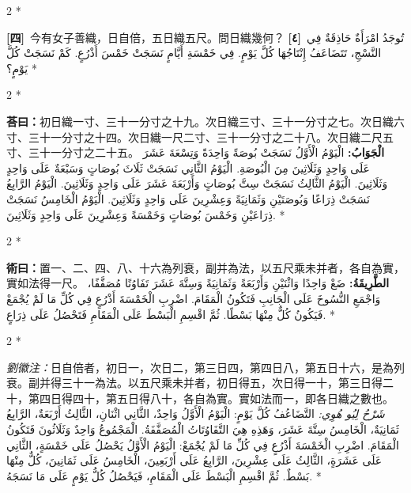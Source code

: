\documentclass[11pt,a4paper]{article}
\newcommand{\ar}[1]{\arabicfont\beginR #1\endR}
\newcommand{\problemnum}[1]{\textbf{[\ignorespaces#1\unskip]}}
\newenvironment{bilingual}{%
  \begin{paracol}{2}%
  \switchcolumn[0]*%
}{%
  \end{paracol}%
}
\newcommand{\cnline}[1]{\switchcolumn[0]\noindent #1 \switchcolumn[1]}
\newcommand{\arline}[1]{\noindent\ar{#1} \switchcolumn[0]*}
\newenvironment{prob bilingual}{%
  \begin{paracol}{2}%
  \switchcolumn[0]*%
}{%
  \end{paracol}%
  \vspace{0.3em}%
}
\begin{document}
\begin{bilingual}
\cnline{\problemnum{四}\, 今有女子善織，日自倍，五日織五尺。問日織幾何？}
\arline{\problemnum{٤}\, تُوجَدُ امْرَأَةٌ حَاذِقَةٌ فِي النَّسْجِ، تَتَضَاعَفُ إِنْتَاجُهَا كُلَّ يَوْمٍ. فِي خَمْسَةِ أَيَّامٍ نَسَجَتْ خَمْسَ أَذْرُعٍ. كَمْ نَسَجَتْ كُلَّ يَوْمٍ؟}
\end{bilingual}

\begin{bilingual}
\cnline{\textcolor{answercolor}{\textbf{荅曰：}}初日織一寸、三十一分寸之十九。次日織三寸、三十一分寸之七。次日織六寸、三十一分寸之十四。次日織一尺二寸、三十一分寸之二十八。次日織二尺五寸、三十一分寸之二十五。}
\arline{\textcolor{answercolor}{\textbf{الْجَوَابُ:}} الْيَوْمُ الْأَوَّلُ نَسَجَتْ بُوصَةً وَاحِدَةً وَتِسْعَةَ عَشَرَ عَلَى وَاحِدٍ وَثَلَاثِينَ مِنَ الْبُوصَةِ. الْيَوْمُ الثَّانِي نَسَجَتْ ثَلَاثَ بُوصَاتٍ وَسَبْعَةٌ عَلَى وَاحِدٍ وَثَلَاثِينَ. الْيَوْمُ الثَّالِثُ نَسَجَتْ سِتَّ بُوصَاتٍ وَأَرْبَعَةَ عَشَرَ عَلَى وَاحِدٍ وَثَلَاثِينَ. الْيَوْمُ الرَّابِعُ نَسَجَتْ ذِرَاعًا وَبُوصَتَيْنِ وَثَمَانِيَةً وَعِشْرِينَ عَلَى وَاحِدٍ وَثَلَاثِينَ. الْيَوْمُ الْخَامِسُ نَسَجَتْ ذِرَاعَيْنِ وَخَمْسَ بُوصَاتٍ وَخَمْسَةً وَعِشْرِينَ عَلَى وَاحِدٍ وَثَلَاثِينَ.}
\end{bilingual}

\begin{bilingual}
\cnline{%
\textcolor{methodcolor}{\textbf{術曰：}}置一、二、四、八、十六為列衰，副并為法，以五尺乘未并者，各自為實，實如法得一尺。
}
\arline{%
\textcolor{methodcolor}{\textbf{الطَّرِيقَةُ:}} ضَعْ وَاحِدًا وَاثْنَيْنِ وَأَرْبَعَةً وَثَمَانِيَةً وَسِتَّةَ عَشَرَ تَفَاوُتًا مُصَفَّفًا، وَاجْمَعِ النُّسُوخَ عَلَى الْجَانِبِ فَتَكُونُ الْمَقَامَ. اضْرِبِ الْخَمْسَةَ أَذْرُعٍ فِي كُلِّ مَا لَمْ يُجْمَعْ فَيَكُونُ كُلٌّ مِنْهَا بَسْطًا. ثُمَّ اقْسِمِ الْبَسْطَ عَلَى الْمَقَامِ فَتَحْصُلُ عَلَى ذِرَاعٍ.
}
\end{bilingual}

\begin{bilingual}
\cnline{%
\textcolor{commentarycolor}{\small\textit{劉徽注：}}日自倍者，初日一，次日二，第三日四，第四日八，第五日十六，是為列衰。副并得三十一為法。以五尺乘未并者，初日得五，次日得一十，第三日得二十，第四日得四十，第五日得八十，各自為實。實如法而一，即各日織之數也。
}
\arline{%
\textcolor{commentarycolor}{\small\textit{شَرْحُ لِيُو هُوِي:}} التَّضَاعُفُ كُلَّ يَوْمٍ: الْيَوْمُ الْأَوَّلُ وَاحِدٌ، الثَّانِي اثْنَانِ، الثَّالِثُ أَرْبَعَةٌ، الرَّابِعُ ثَمَانِيَةٌ، الْخَامِسُ سِتَّةَ عَشَرَ، وَهَذِهِ هِيَ التَّفَاوُتَاتُ الْمُصَفَّفَةُ. الْمَجْمُوعُ وَاحِدٌ وَثَلَاثُونَ فَتَكُونُ الْمَقَامَ. اضْرِبِ الْخَمْسَةَ أَذْرُعٍ فِي كُلِّ مَا لَمْ يُجْمَعْ: الْيَوْمُ الْأَوَّلُ يَحْصُلُ عَلَى خَمْسَةٍ، الثَّانِي عَلَى عَشَرَةٍ، الثَّالِثُ عَلَى عِشْرِينَ، الرَّابِعُ عَلَى أَرْبَعِينَ، الْخَامِسُ عَلَى ثَمَانِينَ، كُلٌّ مِنْهَا بَسْطٌ. ثُمَّ اقْسِمِ الْبَسْطَ عَلَى الْمَقَامِ، فَيَحْصُلُ كُلُّ يَوْمٍ عَلَى مَا نَسَجَهُ.
}
\end{bilingual}
\end{document}
